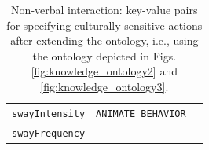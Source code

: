 \documentclass{CSSRforAfrica}
\begin{document}
\begin{table}[H]
\begin{center}
\begin{tabular}{|l l l|}
{\footnotesize \verb+swayIntensity+} 	                & {\footnotesize \verb+ANIMATE_BEHAVIOR+} & {\footnotesize  }\vspace{-1.01mm}\\
{\footnotesize \verb+swayFrequency+} 	                & {\footnotesize \verb++} & {\footnotesize  }\\
\hline \hline
\end{tabular}
\end{center}
\vspace{-6mm}
\caption{Non-verbal interaction: key-value pairs for specifying culturally sensitive actions after extending the ontology, i.e., using the ontology depicted in Figs. \ref{fig:knowledge_ontology2} and \ref{fig:knowledge_ontology3}.}
\label{table:key-value_pairs3}
\end{table}
\clearpage
 
\end{document}
